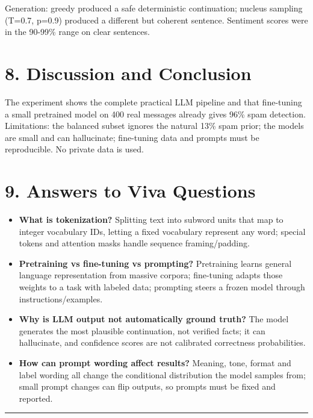Generation: greedy produced a safe deterministic continuation; nucleus
sampling (T=0.7, p=0.9) produced a different but coherent sentence.
Sentiment scores were in the 90-99\% range on clear sentences.

\section{8. Discussion and Conclusion}\label{discussion-and-conclusion}

The experiment shows the complete practical LLM pipeline and that
fine-tuning a small pretrained model on 400 real messages already gives
96\% spam detection. Limitations: the balanced subset ignores the
natural 13\% spam prior; the models are small and can hallucinate;
fine-tuning data and prompts must be reproducible. No private data is
used.

\section{9. Answers to Viva Questions}\label{answers-to-viva-questions}

\begin{itemize}
\tightlist
\item
  \textbf{What is tokenization?} Splitting text into subword units that
  map to integer vocabulary IDs, letting a fixed vocabulary represent
  any word; special tokens and attention masks handle sequence
  framing/padding.
\item
  \textbf{Pretraining vs fine-tuning vs prompting?} Pretraining learns
  general language representation from massive corpora; fine-tuning
  adapts those weights to a task with labeled data; prompting steers a
  frozen model through instructions/examples.
\item
  \textbf{Why is LLM output not automatically ground truth?} The model
  generates the most plausible continuation, not verified facts; it can
  hallucinate, and confidence scores are not calibrated correctness
  probabilities.
\item
  \textbf{How can prompt wording affect results?} Meaning, tone, format
  and label wording all change the conditional distribution the model
  samples from; small prompt changes can flip outputs, so prompts must
  be fixed and reported.
\end{itemize}

\begin{center}\rule{0.5\linewidth}{0.5pt}\end{center}

